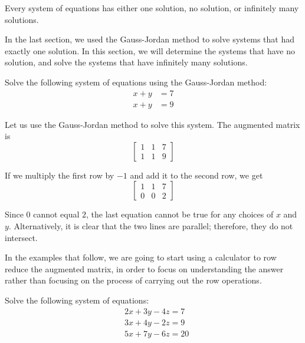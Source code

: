 Every system of equations has either one solution, no solution, or infinitely many solutions.

In the last section, we used the Gauss-Jordan method to solve systems that had exactly one solution.  In this section, we will determine the systems that have no solution, and solve the systems that have infinitely many solutions.

\begin{example}
    Solve the following system of equations using the Gauss-Jordan method:
    \begin{align*}
        x + y & = 7 \\
        x + y & = 9
    \end{align*}
\end{example}

\begin{solution}
    Let us use the Gauss-Jordan method to solve this system. The augmented matrix is
    \[
        \left[
            \begin{array}{cc|c}
                1 & 1 & 7 \\
                1 & 1 & 9
            \end{array}
            \right]
    \]

    If we multiply the first row by $-1$ and add it to the second row, we get
    \[
        \left[
            \begin{array}{cc|c}
                1 & 1 & 7 \\
                0 & 0 & 2
            \end{array}
            \right]
    \]

    Since $0$ cannot equal $2$, the last equation cannot be true for any choices of $x$ and $y$. Alternatively, it is clear that the two lines are parallel; therefore, they do not intersect.
\end{solution}

In the examples that follow, we are going to start using a calculator to row reduce the augmented matrix, in order to focus on understanding the answer rather than focusing on the process of carrying out the row operations.

\begin{example}
    Solve the following system of equations:
    \[
        \begin{aligned}
             & 2x + 3y - 4z = 7  \\
             & 3x + 4y - 2z = 9  \\
             & 5x + 7y - 6z = 20
        \end{aligned}
    \]
\end{example}


